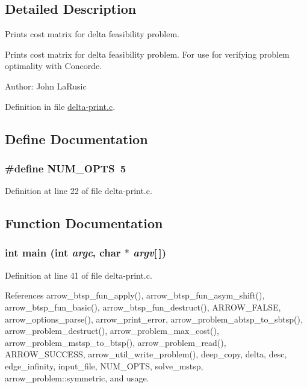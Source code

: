 \subsection{Detailed Description}
Prints cost matrix for delta feasibility problem. 

Prints cost matrix for delta feasibility problem. For use for verifying problem optimality with Concorde.

\begin{Desc}
\item[Author:]John LaRusic \end{Desc}


Definition in file \hyperlink{delta-print_8c-source}{delta-print.c}.

\subsection{Define Documentation}
\hypertarget{delta-print_8c_9b58b2c4af931c8486a986c9deca40f5}{
\subsubsection[{NUM\_\-OPTS}]{\setlength{\rightskip}{0pt plus 5cm}\#define NUM\_\-OPTS~5}}
\label{delta-print_8c_9b58b2c4af931c8486a986c9deca40f5}




Definition at line 22 of file delta-print.c.

\subsection{Function Documentation}
\hypertarget{delta-print_8c_0ddf1224851353fc92bfbff6f499fa97}{
\subsubsection[{main}]{\setlength{\rightskip}{0pt plus 5cm}int main (int {\em argc}, \/  char $\ast$ {\em argv}\mbox{[}$\,$\mbox{]})}}
\label{delta-print_8c_0ddf1224851353fc92bfbff6f499fa97}




Definition at line 41 of file delta-print.c.

References arrow\_\-btsp\_\-fun\_\-apply(), arrow\_\-btsp\_\-fun\_\-asym\_\-shift(), arrow\_\-btsp\_\-fun\_\-basic(), arrow\_\-btsp\_\-fun\_\-destruct(), ARROW\_\-FALSE, arrow\_\-options\_\-parse(), arrow\_\-print\_\-error, arrow\_\-problem\_\-abtsp\_\-to\_\-sbtsp(), arrow\_\-problem\_\-destruct(), arrow\_\-problem\_\-max\_\-cost(), arrow\_\-problem\_\-mstsp\_\-to\_\-btsp(), arrow\_\-problem\_\-read(), ARROW\_\-SUCCESS, arrow\_\-util\_\-write\_\-problem(), deep\_\-copy, delta, desc, edge\_\-infinity, input\_\-file, NUM\_\-OPTS, solve\_\-mstsp, arrow\_\-problem::symmetric, and usage.

